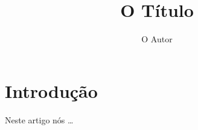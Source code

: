 \documentclass{article}
\title{O Título}
\author{O Autor}
\begin{document}
\maketitle

\section{Introdução}

Neste artigo nós \ldots
\end{document}
